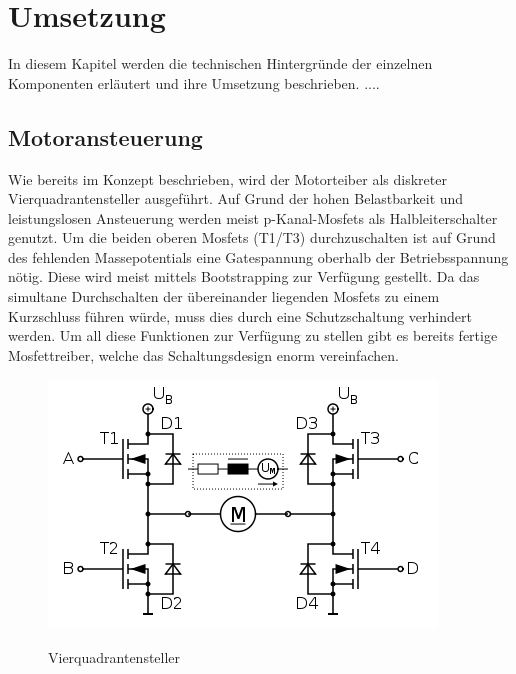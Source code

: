 \chapter{Umsetzung}


In diesem Kapitel werden die technischen Hintergründe der einzelnen Komponenten erläutert und ihre Umsetzung beschrieben.
....


\section{Motoransteuerung}
Wie bereits im Konzept beschrieben, wird der Motorteiber als diskreter Vierquadrantensteller ausgeführt. Auf Grund der hohen Belastbarkeit
und leistungslosen Ansteuerung werden meist p-Kanal-Mosfets als Halbleiterschalter genutzt. Um die beiden oberen Mosfets (T1/T3) durchzuschalten
ist auf Grund des fehlenden Massepotentials eine Gatespannung oberhalb der Betriebsspannung nötig. Diese wird meist mittels Bootstrapping zur
Verfügung gestellt. Da das simultane Durchschalten der übereinander liegenden Mosfets zu einem Kurzschluss führen würde, muss dies durch
eine Schutzschaltung verhindert werden. Um all diese Funktionen zur Verfügung zu stellen gibt es bereits fertige Mosfettreiber,
welche das Schaltungsdesign enorm vereinfachen.

\begin{figure}[H]
\centering
\includegraphics[width=.8\textwidth]{Vierquadrantensteller.png}\\
\caption{Vierquadrantensteller \cite{vierquadrantensteller}}%
\label{fig:Vierquadrantensteller}
\end{figure}


